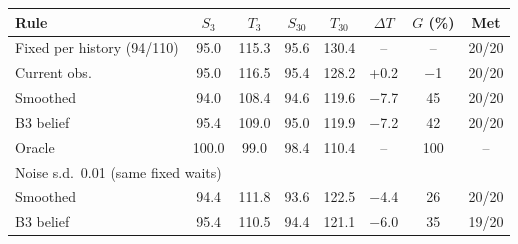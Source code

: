 \begin{tabular}{lccccccc}
\toprule
Rule & $S_3$ & $T_3$ & $S_{30}$ & $T_{30}$ & $\Delta T$ & $G$ (\%) & Met \\
\midrule
Fixed per history (94/110) & 95.0 & 115.3 & 95.6 & 130.4 & -- & -- & 20/20 \\
Current obs. & 95.0 & 116.5 & 95.4 & 128.2 & +0.2 & $-$1 & 20/20 \\
Smoothed & 94.0 & 108.4 & 94.6 & 119.6 & $-$7.7 & 45 & 20/20 \\
B3 belief & 95.4 & 109.0 & 95.0 & 119.9 & $-$7.2 & 42 & 20/20 \\
Oracle & 100.0 & 99.0 & 98.4 & 110.4 & -- & 100 & -- \\
\midrule
\multicolumn{8}{l}{Noise s.d.\ 0.01 (same fixed waits)} \\
Smoothed & 94.4 & 111.8 & 93.6 & 122.5 & $-$4.4 & 26 & 20/20 \\
B3 belief & 95.4 & 110.5 & 94.4 & 121.1 & $-$6.0 & 35 & 19/20 \\
\bottomrule
\end{tabular}
